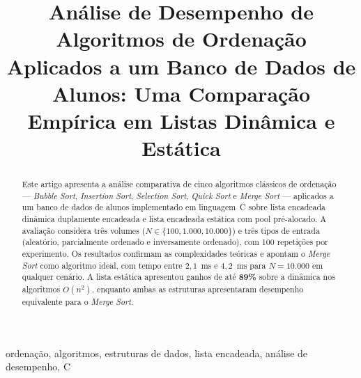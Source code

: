 \documentclass[conference]{IEEEtran}
\begin{document}
\title{Análise de Desempenho de Algoritmos de Ordenação Aplicados a um
Banco de Dados de Alunos: Uma Comparação Empírica em Listas Dinâmica e Estática}

\author{
\and
{}
\and
{}
\and
{}
\and
{}
}

\maketitle

\begin{abstract}
Este artigo apresenta a análise comparativa de cinco algoritmos clássicos de
ordenação --- \textit{Bubble Sort}, \textit{Insertion Sort}, \textit{Selection Sort},
\textit{Quick Sort} e \textit{Merge Sort} --- aplicados a um banco de dados de alunos
implementado em linguagem~C sobre lista encadeada dinâmica duplamente encadeada e
lista encadeada estática com pool pré-alocado. A avaliação considera três volumes
($N \in \{100, 1{.}000, 10{.}000\}$) e três tipos de entrada (aleatório, parcialmente
ordenado e inversamente ordenado), com 100 repetições por experimento. Os resultados
confirmam as complexidades teóricas e apontam o \textit{Merge Sort} como algoritmo
ideal, com tempo entre $2{,}1$~ms e $4{,}2$~ms para $N = 10{.}000$ em qualquer
cenário. A lista estática apresentou ganhos de até \textbf{89\%} sobre a dinâmica
nos algoritmos $O(n^{2})$, enquanto ambas as estruturas apresentaram desempenho
equivalente para o \textit{Merge Sort}.
\end{abstract}

\begin{IEEEkeywords}
ordenação, algoritmos, estruturas de dados, lista encadeada, análise de desempenho, C
\end{IEEEkeywords}
\end{document}
